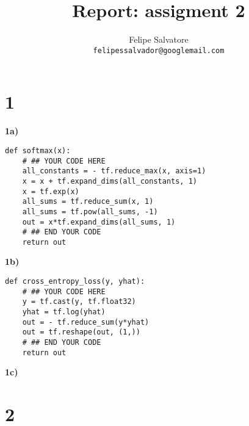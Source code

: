 \documentclass{article}
\title{Report: assigment 2}
\author{Felipe Salvatore\\
\texttt{felipessalvador@googlemail.com}}
\begin{document}
\maketitle
\section{1}
\textbf{1a)} 
\begin{verbatim}
def softmax(x):
    # ## YOUR CODE HERE
    all_constants = - tf.reduce_max(x, axis=1)
    x = x + tf.expand_dims(all_constants, 1)
    x = tf.exp(x)
    all_sums = tf.reduce_sum(x, 1)
    all_sums = tf.pow(all_sums, -1)
    out = x*tf.expand_dims(all_sums, 1)
    # ## END YOUR CODE
    return out
\end{verbatim}


\textbf{1b)}
\begin{verbatim}
def cross_entropy_loss(y, yhat):
    # ## YOUR CODE HERE
    y = tf.cast(y, tf.float32)
    yhat = tf.log(yhat)
    out = - tf.reduce_sum(y*yhat)
    out = tf.reshape(out, (1,))
    # ## END YOUR CODE
    return out
\end{verbatim}

\textbf{1c)}

\section{2}
\end{document}
